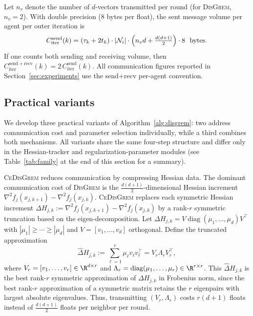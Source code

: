 \documentclass[review,onefignum,onetabnum]{siamart171218}
\begin{document}
	Let $n_v$ denote the number of $d$-vectors transmitted per round (for \textsc{DisGrem}, $n_v=2$).
	With double precision (8 bytes per float), the sent message volume per agent per outer iteration is
	\begin{equation}\label{eq:comm_cost_iter}
		C_{\mathrm{iter}}^{\mathrm{send}}(k)
		= (\tau_k+2t_k)\cdot |\mathcal N_i|\cdot \Bigl(n_v d + \tfrac{d(d+1)}{2}\Bigr)\cdot 8 \ \ \text{bytes}.
	\end{equation}
	If one counts both sending and receiving volume, then
	$C_{\mathrm{iter}}^{\mathrm{send+recv}}(k)=2\,C_{\mathrm{iter}}^{\mathrm{send}}(k)$.
	All communication figures reported in Section~\ref{sec:experiments}
	use the send+recv per-agent convention.
	
	\subsection{Practical variants}\label{ssec:variants}
	
	We develop three practical variants of Algorithm~\ref{alg:disgrem}:
	two address communication cost and parameter selection individually,
	while a third combines both mechanisms.
	All variants share the same four-step structure and differ only in the
	Hessian-tracker and regularization-parameter modules
	(see Table~\ref{tab:family} at the end of this section for a summary).
	
	\textsc{CeDisGrem} reduces communication by compressing Hessian data.
	The dominant communication cost of \textsc{DisGrem} is the $\frac{d(d+1)}{2}$-dimensional
	Hessian increment $\nabla^2 f_j(x_{j,k+1})-\nabla^2 f_j(x_{j,k})$.
	\textsc{CeDisGrem} replaces each symmetric Hessian increment
	$\Delta H_{j,k}:=\nabla^2 f_j(x_{j,k+1})-\nabla^2 f_j(x_{j,k})$
	by a rank-$r$ symmetric truncation based on the eigen-decomposition.
	Let $\Delta H_{j,k}=V\operatorname{diag}(\mu_1,\dots,\mu_d)V^\top$ with
	$|\mu_1|\ge \cdots \ge |\mu_d|$ and $V=[v_1,\dots,v_d]$ orthogonal.
	Define the truncated approximation
	\[
	\hat\Delta H_{j,k}:=\sum_{\ell=1}^r \mu_\ell v_\ell v_\ell^\top
	= V_r\Lambda_r V_r^\top,
	\]
	where $V_r=[v_1,\dots,v_r]\in\R^{d\times r}$ and $\Lambda_r=\operatorname{diag}(\mu_1,\dots,\mu_r)\in\R^{r\times r}$.
	This $\hat\Delta H_{j,k}$ is the best rank-$r$ symmetric approximation of $\Delta H_{j,k}$ in Frobenius norm,
	since the best rank-$r$ approximation of a symmetric matrix retains the $r$ eigenpairs with largest absolute eigenvalues.
	Thus, transmitting $(V_r,\Lambda_r)$ costs $r(d+1)$ floats instead of $\frac{d(d+1)}{2}$ floats per neighbor per round.
	
\end{document}

